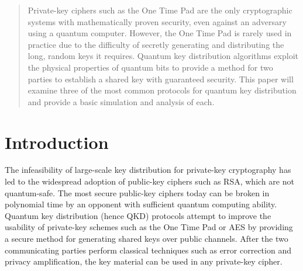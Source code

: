\documentclass[conference]{IEEEtran}
\begin{document}
\begin{abstract}
Private-key ciphers such as the One Time Pad are the only cryptographic systems with mathematically proven security, even against an adversary using a quantum computer. However, the One Time Pad is rarely used in practice due to the difficulty of secretly generating and distributing the long, random keys it requires. Quantum key distribution algorithms exploit the physical properties of quantum bits to provide a method for two parties to establish a shared key with guaranteed security. This paper will examine three of the most common protocols for quantum key distribution and provide a basic simulation and analysis of each.
\end{abstract}





%
\IEEEpeerreviewmaketitle
\section{Introduction}
The infeasibility of large-scale key distribution for private-key cryptography has led to the widespread adoption of public-key ciphers such as RSA, which are not quantum-safe. The most secure public-key ciphers today can be broken in polynomial time by an opponent with sufficient quantum computing ability. Quantum key distribution (hence QKD) protocols attempt to improve the usability of private-key schemes such as the One Time Pad or AES by providing a secure method for generating shared keys over public channels. After the two communicating parties perform classical techniques such as error correction and privacy amplification, the key material can be used in any private-key cipher.\\
\end{document}
